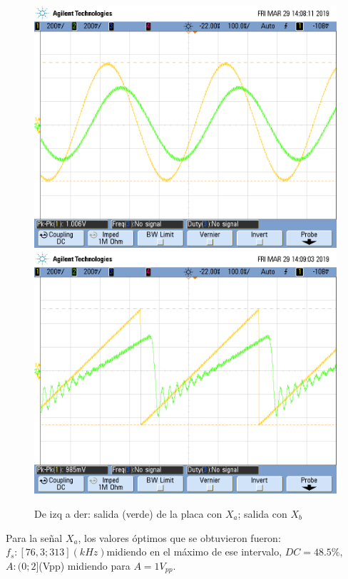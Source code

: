 \documentclass[../../ASSD_TP1_G7.tex]{subfiles}
\begin{document}
\begin{figure}[H]

\centering{}\includegraphics[scale=0.25]{Imagenes/llave_senooo_pto_a1}\includegraphics[scale=0.25]{Imagenes/llave_diente_pto_a}\caption{De izq a der: salida (verde) de la placa con $X_{a}$; salida con
$X_{b}$}
\end{figure}

Para la señal $X_{a}$, los valores óptimos que se obtuvieron fueron:
$f_{s}:[76,3;313](kHz)$midiendo en el máximo de ese intervalo, $DC=48.5\%,$$A:(0;2]$(Vpp)
midiendo para $A=1V_{pp}$.
\end{document}

